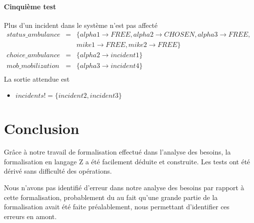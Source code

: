 \documentclass{report}
\begin{document}
\subsubsection{Cinquième test}
Plus d'un incident dans le système n'est pas affecté
\begin{eqnarray*}
status\_ambulance &=& \{alpha1 \rightarrow FREE, alpha2 \rightarrow CHOSEN, alpha3 \rightarrow FREE, \\ 
	&& mike1 \rightarrow FREE, mike2 \rightarrow FREE\} \\
choice\_ambulance &=& \{alpha2 \rightarrow incident1\} \\
mob\_mobilization &=& \{alpha3 \rightarrow incident4\} \\
\end{eqnarray*}
La sortie attendue est 
\begin{itemize}
	\item $incidents! = \{incident2, incident3\}$
\end{itemize}

\chapter*{Conclusion}

Grâce à notre travail de formalisation effectué dans l'analyse des besoins, 
la formalisation en langage Z a été facilement déduite et construite. Les tests
ont été dérivé sans difficulté des opérations. 

Nous n'avons pas identifié d'erreur dans notre analyse des besoins par
rapport à cette formalisation, probablement du au fait qu'une grande partie
de la formalisation avait été faite préalablement, nous permettant d'identifier
ces erreurs en amont.
\end{document}
